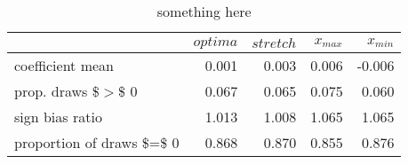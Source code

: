 \begin{table}[ht]
\centering
\begin{tabular}{lrrrr}
  \hline
  & $optima$ & $stretch$ & $x_{max}$ & $x_{min}$ \\ 
  \hline
coefficient mean & 0.001 & 0.003 & 0.006 & -0.006 \\ 
  prop. draws \$$>$\$ 0 & 0.067 & 0.065 & 0.075 & 0.060 \\ 
  sign bias ratio & 1.013 & 1.008 & 1.065 & 1.065 \\ 
  proportion of draws \$=\$ 0 & 0.868 & 0.870 & 0.855 & 0.876 \\ 
   \hline
\end{tabular}
\caption{something here} 
\end{table}
